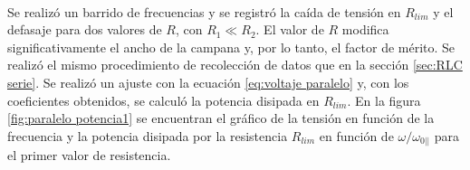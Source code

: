 \paragraph{}
Se realizó un barrido de frecuencias y se registró la caída de tensión en $R_{lim}$ y el defasaje para dos valores de $R$, con $R_1\ll R_2$. El valor de $R$ modifica significativamente el ancho de la campana y, por lo tanto, el factor de mérito. Se realizó el mismo procedimiento de recolección de datos que en la sección \ref{sec:RLC serie}. Se realizó un ajuste con la ecuación \eqref{eq:voltaje paralelo} y, con los coeficientes obtenidos, se calculó la potencia disipada en $R_{lim}$. En la figura \ref{fig:paralelo potencia1} se encuentran el gráfico de la tensión en función de la frecuencia y la potencia disipada por la resistencia $R_{lim}$ en función de $\omega/\omega_{0||}$ para el primer valor de resistencia. 
